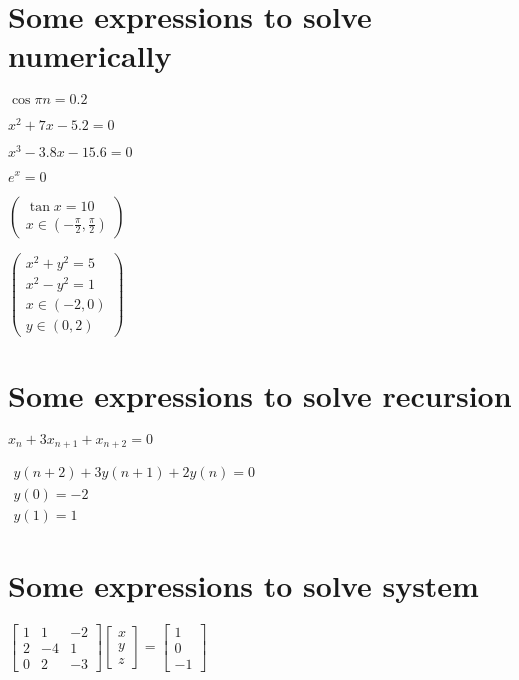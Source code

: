 \documentclass{article}
\begin{document}
\section{Some expressions to solve numerically}

$\cos \pi n=0.2$

$x^{2}+7x-5.2=0$

$x^{3}-3.8x-15.6=0$

$e^{x}=0$

$\left( 
\begin{array}{c}
\tan x=10 \\ 
x\in \left( -\frac{\pi }{2},\frac{\pi }{2}\right)%
\end{array}%
\right) $

$\left( 
\begin{array}{c}
x^{2}+y^{2}=5 \\ 
x^{2}-y^{2}=1 \\ 
x\in \left( -2,0\right) \\ 
y\in \left( 0,2\right)%
\end{array}%
\right) $

\section{Some expressions to solve recursion}

$x_{n}+3x_{n+1}+x_{n+2}=0$

$%
\begin{array}{c}
y\left( n+2\right) +3y\left( n+1\right) +2y\left( n\right) =0 \\ 
y\left( 0\right) =-2 \\ 
y\left( 1\right) =1%
\end{array}%
$

\section{Some expressions to solve system}

$\left[ 
\begin{array}{rrr}
1 & 1 & -2 \\ 
2 & -4 & 1 \\ 
0 & 2 & -3%
\end{array}%
\right] \left[ 
\begin{array}{c}
x \\ 
y \\ 
z%
\end{array}%
\right] =\left[ 
\begin{array}{c}
1 \\ 
0 \\ 
-1%
\end{array}%
\right] $
\end{document}
